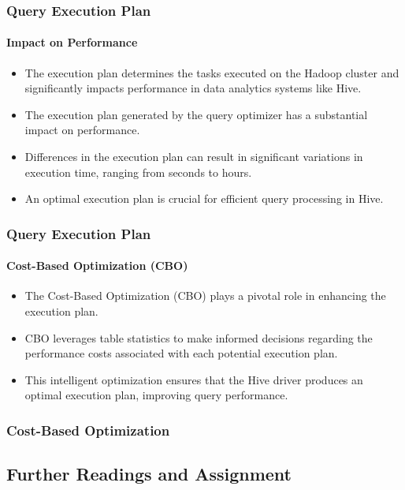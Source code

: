 	\begin{frame}
	\frametitle{Query Execution Plan}
	\framesubtitle{Impact on Performance}
	
	\begin{itemize}
	\item The execution plan determines the tasks executed on the Hadoop cluster and significantly impacts performance in data analytics systems like Hive.
	  \item The execution plan generated by the query optimizer has a substantial impact on performance.
	  \item Differences in the execution plan can result in significant variations in execution time, ranging from seconds to hours.
	  \item An optimal execution plan is crucial for efficient query processing in Hive.
	\end{itemize}
	
	\end{frame}
	
	\begin{frame}
	\frametitle{Query Execution Plan}
	\framesubtitle{Cost-Based Optimization (CBO)}
	
	\begin{itemize}
	  \item The Cost-Based Optimization (CBO) plays a pivotal role in enhancing the execution plan.
	  \item CBO leverages table statistics to make informed decisions regarding the performance costs associated with each potential execution plan.
	  \item This intelligent optimization ensures that the Hive driver produces an optimal execution plan, improving query performance.
	\end{itemize}
	
	\end{frame}
\subsubsection{Cost-Based Optimization}
\subsection{Further Readings and Assignment}


